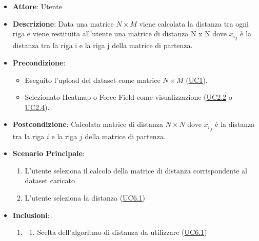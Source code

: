     \begin{itemize}
    \item \textbf{Attore}: Utente
    \item \textbf{Descrizione}: Data una matrice $N \times M$ viene calcolata la distanza tra ogni riga e viene restituita all'utente una matrice di distanza N x N dove ${x_i}_j$ è la distanza tra la riga i e la riga j della matrice di partenza.
    \item \textbf{Precondizione}: 
    \begin{itemize}
        \item Eseguito l'upload del dataset come matrice $N\times M$ (\hyperref[uc1]{UC1}).
        \item Selezionato Heatmap o Force Field come visualizzazione (\hyperref[uc2.2]{UC2.2} o \hyperref[uc2.4]{UC2.4}).
    \end{itemize}  
    \item \textbf{Postcondizione}: Calcolata matrice di distanza $N \times N$ dove ${x_i}_j$ è la distanza tra la riga $i$ e la riga $j$ della matrice di partenza.
    \item \textbf{Scenario Principale}: 
    \begin{enumerate}
        \item L'utente seleziona il calcolo della matrice di distanza corrispondente al dataset caricato
        \item L'utente seleziona la distanza (\hyperref[uc6.1]{UC6.1})
    \end{enumerate}  
    \item \textbf{Inclusioni}:
        \begin{enumerate}
                \item \begin{enumerate}
                    \item Scelta dell'algoritmo di distanza da utilizzare (\hyperref[uc6.1]{UC6.1})
                \end{enumerate}
        \end{enumerate} 
    \end{itemize}
    
